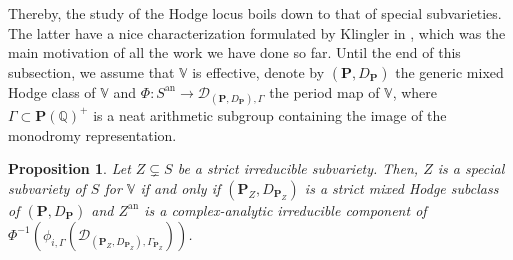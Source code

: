 \documentclass[10pt]{article}
\numberwithin{equation}{subsection}
\theoremstyle{plain}
\newtheorem{proposition}[theorem]{Proposition}
\theoremstyle{definition}
\theoremstyle{remark}
\newcommand{\Q}{\mathbb Q}
\newcommand{\V}{\mathbb V}
\newcommand{\pp}{\mathbf P}
\newcommand{\an}{\mathrm{an}}
\newcommand{\period}{\mathscr{D}}
\begin{document}
Thereby, the study of the Hodge locus boils down to that of special subvarieties. The latter have a nice characterization formulated by Klingler in \cite{klingler_atyp}, which was the main motivation of all the work we have done so far. Until the end of this subsection, we assume that $\V$ is effective, denote by $(\pp, D_\pp)$ the generic mixed Hodge class of $\V$ and $\Phi : S^\an \rightarrow \period_{(\pp, D_\pp), \Gamma}$ the period map of $\V$, where $\Gamma \subset \pp(\Q)^+$ is a neat arithmetic subgroup containing the image of the monodromy representation.
\begin{proposition}\label{specarac}
Let $Z \subsetneq S$ be a strict irreducible subvariety. Then, $Z$ is a special subvariety of $S$ for $\V$ if and only if $(\pp_Z,D_{\pp_Z})$ is a strict mixed Hodge subclass of $(\pp, D_\pp)$ and $Z^\an$ is a complex-analytic irreducible component of $\Phi^{-1}(\phi_{i, \Gamma}(\period_{(\pp_Z, D_{\pp_Z}), \Gamma_{\pp_Z}}))$.
\end{proposition}
\end{document}
